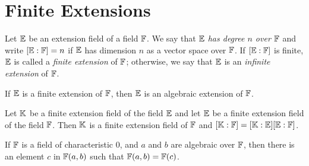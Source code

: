 \section{Finite Extensions}

\begin{definition}
	Let $\mathbb{E}$ be an extension field of a field $\mathbb{F}$. We say that $\mathbb{E}$ \textit{has degree $n$ over $\mathbb{F}$} and write $[\mathbb{E}:\mathbb{F}]=n$ if $\mathbb{E}$ has dimension $n$ as a vector space over $\mathbb{F}$. If $[\mathbb{E}:\mathbb{F}]$ is finite, $\mathbb{E}$ is called a \textit{finite extension} of $\mathbb{F}$; otherwise, we say that $\mathbb{E}$ is an \textit{infinite extension} of $\mathbb{F}$.
\end{definition}

\begin{theorem}
	If $\mathbb{E}$ is a finite extension of $\mathbb{F}$, then $\mathbb{E}$ is an algebraic extension of $\mathbb{F}$.
\end{theorem}

\begin{theorem}[$\mathbf{[\K:\F] = [\K:\E][\E:\F]}$]
	Let $\mathbb{K}$ be a finite extension field of the field $\mathbb{E}$ and let $\mathbb{E}$ be a finite extension field of the field $\mathbb{F}$. Then $\mathbb{K}$ is a finite extension field of $\mathbb{F}$ and $[\mathbb{K}:\mathbb{F}] = [\mathbb{K}:\mathbb{E}][\mathbb{E}:\mathbb{F}]$.
\end{theorem}

\begin{theorem}
	If $\mathbb{F}$ is a field of characteristic 0, and $a$ and $b$ are algebraic over $\mathbb{F}$, then there is an element $c$ in $\mathbb{F}(a,b)$ such that $\mathbb{F}(a,b) = \mathbb{F}(c)$.
\end{theorem}
